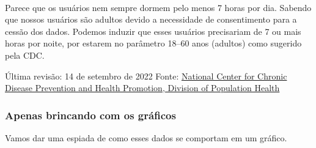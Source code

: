 \begin{center}
\end{center}
{ \hspace*{\fill} \\}

Parece que os usuários nem sempre dormem pelo menos 7 horas por dia.
Sabendo que nossos usuários são adultos devido a necessidade de
consentimento para a cessão dos dados. Podemos induzir que esses
usuários precisariam de 7 ou mais horas por noite, por estarem no
parâmetro 18--60 anos (adultos) como sugerido pela CDC.

Última revisão: 14 de setembro de 2022 Fonte:
\href{https://www.cdc.gov/sleep/about_sleep/how_much_sleep.html}{National
    Center for Chronic Disease Prevention and Health Promotion, Division of
    Population Health}

\subsubsection{Apenas brincando com os gráficos}


Vamos dar uma espiada de como esses dados se comportam em um gráfico.

